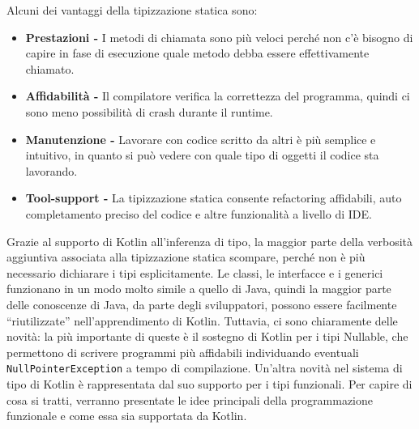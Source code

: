 Alcuni dei vantaggi della tipizzazione statica sono:
\begin{itemize}
  \item {\bfseries Prestazioni -} I metodi di chiamata sono più veloci perché non c'è bisogno di capire in fase
        di esecuzione quale metodo debba essere effettivamente chiamato.
  \item {\bfseries Affidabilità -} Il compilatore verifica la correttezza del programma, quindi ci sono meno
        possibilità di crash durante il runtime.
  \item {\bfseries Manutenzione -} Lavorare con codice scritto da altri è più semplice e intuitivo, in quanto
        si può vedere con quale tipo di oggetti il codice sta lavorando.
  \item {\bfseries Tool-support -} La tipizzazione statica consente refactoring affidabili, auto completamento
        preciso del codice e altre funzionalità a livello di IDE.
\end{itemize}
Grazie al supporto di Kotlin all'inferenza di tipo, la maggior parte della verbosità aggiuntiva associata
alla tipizzazione statica scompare, perché non è più necessario dichiarare i tipi esplicitamente.
Le classi, le interfacce e i generici funzionano in un modo molto simile a quello di Java, quindi la
maggior parte delle conoscenze di Java, da parte degli sviluppatori, possono essere facilmente “riutilizzate”
nell’apprendimento di Kotlin. Tuttavia, ci sono chiaramente delle novità: la più importante di queste è il sostegno
di Kotlin per i tipi Nullable, che permettono di scrivere programmi più affidabili individuando eventuali
\texttt{NullPointerException} a tempo di compilazione. Un'altra novità nel sistema di tipo di Kotlin è rappresentata
dal suo supporto per i tipi funzionali. Per capire di cosa si tratti, verranno presentate le idee principali
della programmazione funzionale e come essa sia supportata da Kotlin.\\

